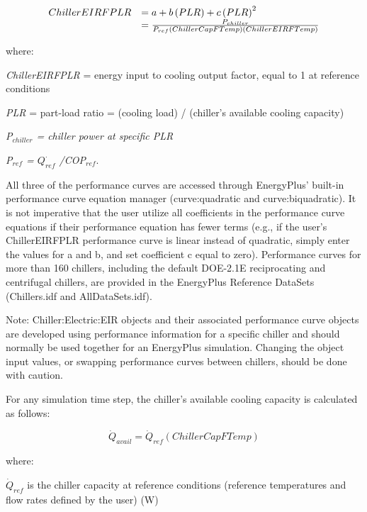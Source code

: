 \begin{equation}
  \begin{array}{rl}
    ChillerEIRFPLR &= a + b\left(PLR\right) + c\left(PLR\right)^2\\
                   &= \frac{P_{chiller}}{{P_{ref}}\left( {ChillerCapFTemp} \right)\left( {ChillerEIRFTemp} \right)}
  \end{array}
\end{equation}

where:

\emph{ChillerEIRFPLR} = energy input to cooling output factor, equal to 1 at reference conditions

\emph{PLR} = part-load ratio = (cooling load) / (chiller's available cooling capacity)

\emph{P\(_{chiller}\) = chiller power at specific PLR}

\emph{P\(_{ref}\) = \({Q^\cdot_{ref}}\) /COP\(_{ref}\)}.

All three of the performance curves are accessed through EnergyPlus' built-in performance curve equation manager (curve:quadratic and curve:biquadratic). It is not imperative that the user utilize all coefficients in the performance curve equations if their performance equation has fewer terms (e.g., if the user's ChillerEIRFPLR performance curve is linear instead of quadratic, simply enter the values for a and b, and set coefficient c equal to zero). Performance curves for more than 160 chillers, including the default DOE-2.1E reciprocating and centrifugal chillers, are provided in the EnergyPlus Reference DataSets (Chillers.idf and AllDataSets.idf).

Note: Chiller:Electric:EIR objects and their associated performance curve objects are developed using performance information for a specific chiller and should normally be used together for an EnergyPlus simulation. Changing the object input values, or swapping performance curves between chillers, should be done with caution.

For any simulation time step, the chiller's available cooling capacity is calculated as follows:

\begin{equation}
{\dot{Q}_{avail}} = {\dot{Q}_{ref}}\left( {ChillerCapFTemp} \right)
\end{equation}

where:

\(\dot{Q}_{ref}\) is the chiller capacity at reference conditions (reference temperatures and flow rates defined by the user) (W)

